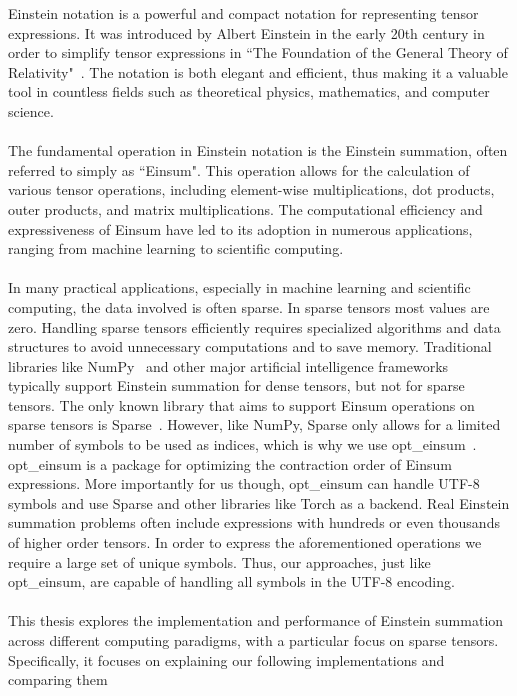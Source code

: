 Einstein notation is a powerful and compact notation for representing
tensor expressions. It was introduced by Albert Einstein in the early 20th century
in order to simplify tensor expressions in ``The Foundation of the General Theory of 
Relativity"~\cite{einstein1916}. The notation is both elegant and efficient, 
thus making it a valuable tool in countless fields such as theoretical physics, 
mathematics, and computer science.
\\\\
The fundamental operation in Einstein notation is the Einstein summation,
often referred to simply as ``Einsum". This operation allows for the calculation of
various tensor operations, including element-wise multiplications, dot products,
outer products, and matrix multiplications. The computational efficiency and
expressiveness of Einsum have led to its adoption in numerous applications,
ranging from machine learning to scientific computing.
\\\\
In many practical applications, especially in machine learning and scientific computing,
the data involved is often sparse. In sparse tensors most values are zero. Handling sparse
tensors efficiently requires specialized algorithms and data structures to avoid
unnecessary computations and to save memory. Traditional libraries like NumPy~\cite{numpy}
and other major artificial intelligence frameworks~\cite{tensorflow, pytorch} typically
support Einstein summation for dense tensors, but not for sparse tensors. The only known
library that aims to support Einsum operations on sparse tensors is Sparse~\cite{sparse}.
However, like NumPy, Sparse only allows for a limited number of symbols to be used as
indices, which is why we use opt\_einsum~\cite{opt_einsum}. opt\_einsum is a package for 
optimizing the contraction order of Einsum expressions. More importantly for us though, 
opt\_einsum can handle UTF-8 symbols and use Sparse and other libraries like Torch
as a backend. Real Einstein summation problems often include expressions with hundreds or
even thousands of higher order tensors. In order to express the aforementioned operations
we require a large set of unique symbols. Thus, our approaches, just like opt\_einsum, are
capable of handling all symbols in the UTF-8 encoding.
\\\\
This thesis explores the implementation and performance of Einstein summation
across different computing paradigms, with a particular focus on sparse tensors.
Specifically, it focuses on explaining our following implementations and comparing them
